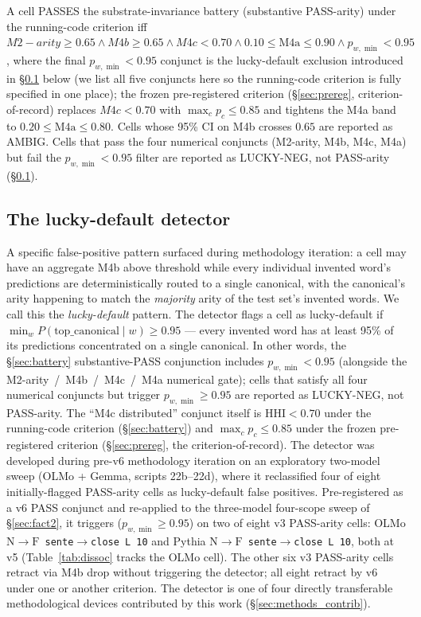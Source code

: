 \documentclass[11pt,letterpaper]{article}
\newcommand{\NtoF}{\ensuremath{\mathrm{N}\!\to\!\mathrm{F}}}
\newcommand{\Ma}{M2-arity}
\newcommand{\Mbfb}{M4b}
\newcommand{\Mbfc}{M4c}
\newcommand{\pwmin}{\ensuremath{p_{w,\min}}}
\begin{document}
A cell PASSES the substrate-invariance battery (substantive
PASS-arity) under the running-code criterion iff
$\Ma \geq 0.65 \wedge \Mbfb \geq 0.65 \wedge \Mbfc < 0.70 \wedge
0.10 \leq \text{M4a} \leq 0.90 \wedge \pwmin < 0.95$, where the final
$\pwmin < 0.95$ conjunct is the lucky-default exclusion introduced in
\S\ref{sec:lucky} below (we list all five conjuncts here so the
running-code criterion is fully specified in one place); the frozen
pre-registered criterion (\S\ref{sec:prereg}, criterion-of-record)
replaces $\Mbfc < 0.70$ with $\max_c p_c \leq 0.85$ and tightens the
M4a band to $0.20 \leq \text{M4a} \leq 0.80$. Cells whose 95\% CI on
\Mbfb{} crosses $0.65$ are reported as AMBIG. Cells that pass the four
numerical conjuncts (\Ma{}, \Mbfb{}, \Mbfc{}, M4a) but fail the
$\pwmin < 0.95$ filter are reported as LUCKY-NEG, not PASS-arity
(\S\ref{sec:lucky}).

\subsection{The lucky-default detector}
\label{sec:lucky}

A specific false-positive pattern surfaced during methodology
iteration: a cell may have an aggregate \Mbfb{} above threshold while
every individual invented word's predictions are deterministically
routed to a single canonical, with the canonical's arity happening to
match the \emph{majority} arity of the test set's invented words. We
call this the \emph{lucky-default} pattern. The detector flags a cell
as lucky-default if
$\min_w P(\text{top\_canonical} \mid w) \geq 0.95$ --- every invented
word has at least 95\% of its predictions concentrated on a single
canonical. In other words, the \S\ref{sec:battery} substantive-PASS
conjunction includes $\pwmin < 0.95$ (alongside the
\Ma{}~/~\Mbfb{}~/~\Mbfc{}~/~M4a numerical gate); cells that satisfy
all four numerical conjuncts but trigger $\pwmin \geq 0.95$ are
reported as LUCKY-NEG, not PASS-arity. The ``\Mbfc{} distributed''
conjunct itself is $\mathrm{HHI} < 0.70$ under the running-code
criterion (\S\ref{sec:battery}) and $\max_c p_c \leq 0.85$ under the
frozen pre-registered criterion (\S\ref{sec:prereg}, the
criterion-of-record). The detector was developed during pre-v6
methodology iteration on an exploratory two-model sweep (OLMo + Gemma,
scripts 22b--22d), where it reclassified four of eight initially-flagged
PASS-arity cells as lucky-default false positives.
Pre-registered as a v6 PASS conjunct and re-applied to the
three-model four-scope sweep of \S\ref{sec:fact2}, it triggers
($\pwmin \geq 0.95$) on two of eight v3 PASS-arity cells: OLMo
\texttt{\NtoF{} sente$\to$close L\,10} and Pythia
\texttt{\NtoF{} sente$\to$close L\,10}, both at v5
(Table~\ref{tab:dissoc} tracks the OLMo cell). The other six v3
PASS-arity cells retract via \Mbfb{} drop without triggering the
detector; all eight retract by v6 under one or another criterion.
The detector is one of four directly transferable methodological
devices contributed by this work
(\S\ref{sec:methods_contrib}).
\end{document}
